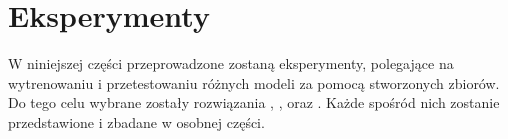 \chapter{Eksperymenty}

W niniejszej części przeprowadzone zostaną eksperymenty, polegające na wytrenowaniu i przetestowaniu różnych modeli za pomocą stworzonych zbiorów. Do tego celu wybrane zostały rozwiązania , ,  oraz . Każde spośród nich zostanie przedstawione i zbadane w osobnej części.







